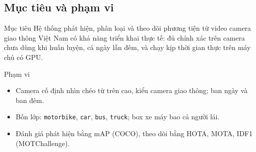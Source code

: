 \documentclass[aspectratio=\mlwAspectRatio, \mlwBaseSize, t]{beamer}
\begin{document}
\subsection{Mục tiêu và phạm vi}
\begin{frame}{\stitle}
  \begin{block}{Mục tiêu}
    Hệ thống phát hiện, phân loại và theo dõi phương tiện từ video camera giao thông Việt Nam có
    \alert{khả năng triển khai thực tế}: đủ chính xác trên camera chưa dùng khi huấn luyện, cả ngày lẫn đêm, và chạy
    kịp thời gian thực trên máy chủ có GPU.
  \end{block}
  \begin{block}{Phạm vi}
    \begin{itemize}
      \item Camera cố định nhìn chéo từ trên cao, kiểu camera giao thông; ban ngày và ban đêm.
      \item Bốn lớp: \texttt{motorbike}, \texttt{car}, \texttt{bus}, \texttt{truck}; box xe máy bao cả người lái.
      \item Đánh giá phát hiện bằng mAP (COCO), theo dõi bằng HOTA, MOTA, IDF1 (MOTChallenge).
    \end{itemize}
  \end{block}
\end{frame}
\end{document}
